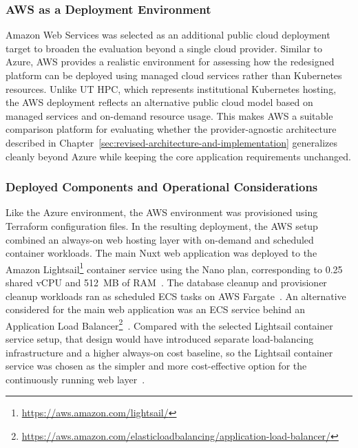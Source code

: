 \subsubsection{AWS as a Deployment Environment} \label{subsubsec:aws-as-a-deployment-environment}
Amazon Web Services was selected as an additional public cloud deployment target to broaden the evaluation beyond a single cloud provider.
Similar to Azure, AWS provides a realistic environment for assessing how the redesigned platform can be deployed using managed cloud services rather than Kubernetes resources.
Unlike UT HPC, which represents institutional Kubernetes hosting, the AWS deployment reflects an alternative public cloud model based on managed services and on-demand resource usage.
This makes AWS a suitable comparison platform for evaluating whether the provider-agnostic architecture described in Chapter~\ref{sec:revised-architecture-and-implementation} generalizes cleanly beyond Azure while keeping the core application requirements unchanged.

\subsubsection{Deployed Components and Operational Considerations} \label{subsubsec:deployed-components-and-operational-considerations-aws}
Like the Azure environment, the AWS environment was provisioned using Terraform configuration files.
In the resulting deployment, the AWS setup combined an always-on web hosting layer with on-demand and scheduled container workloads.
The main Nuxt web application was deployed to the Amazon Lightsail\footnote{\url{https://aws.amazon.com/lightsail/}} container service using the Nano plan, corresponding to 0.25 shared vCPU and 512~MB of RAM~\cite{aws_lightsail_pricing}.
The database cleanup and provisioner cleanup workloads ran as scheduled ECS tasks on AWS Fargate~\cite{aws_ecs_scheduling_tasks}.
An alternative considered for the main web application was an ECS service behind an Application Load Balancer\footnote{\url{https://aws.amazon.com/elasticloadbalancing/application-load-balancer/}}~\cite{aws_ecs_load_balancing}.
Compared with the selected Lightsail container service setup, that design would have introduced separate load-balancing infrastructure and a higher always-on cost baseline, so the Lightsail container service was chosen as the simpler and more cost-effective option for the continuously running web layer~\cite{aws_elastic_load_balancing_pricing,aws_lightsail_pricing}.

